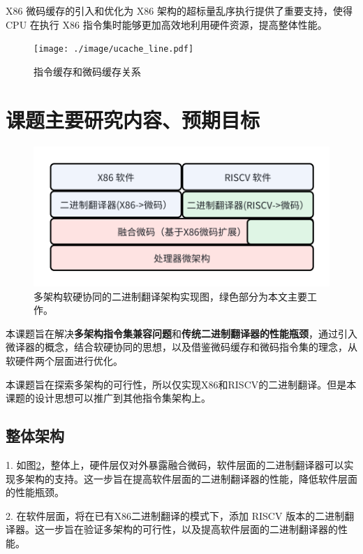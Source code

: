 \documentclass{Style/ucasproposal}%
\begin{document}
X86 微码缓存的引入和优化为 X86 架构的超标量乱序执行提供了重要支持，使得 CPU 在执行 X86 指令集时能够更加高效地利用硬件资源，提高整体性能。

\begin{figure}[h]
  \centering
  \texttt{[image: ./image/ucache\_line.pdf]}
  \caption{指令缓存和微码缓存关系}
  \label{img:ucache_line}
\end{figure}


\section{课题主要研究内容、预期目标}


\begin{figure}[h]
  \centering
  \includegraphics[width=0.8\linewidth]{./feishuImage/implement_arch.png}
  \caption{多架构软硬协同的二进制翻译架构实现图，绿色部分为本文主要工作。}
  \label{img:implement_arch}
\end{figure}

本课题旨在解决\textbf{多架构指令集兼容问题}和\textbf{传统二进制翻译器的性能瓶颈}，通过引入微译器的概念，结合软硬协同的思想，以及借鉴微码缓存和微码指令集的理念，从软硬件两个层面进行优化。

本课题旨在探索多架构的可行性，所以仅实现X86和RISCV的二进制翻译。但是本课题的设计思想可以推广到其他指令集架构上。

\subsection{整体架构}
1. 如图\ref{img:implement_arch}，整体上，硬件层仅对外暴露融合微码，软件层面的二进制翻译器可以实现多架构的支持。这一步旨在提高软件层面的二进制翻译器的性能，降低软件层面的性能瓶颈。

2. 在软件层面，将在已有X86二进制翻译的模式下，添加 RISCV 版本的二进制翻译器。这一步旨在验证多架构的可行性，以及提高软件层面的二进制翻译器的性能。
\end{document}
